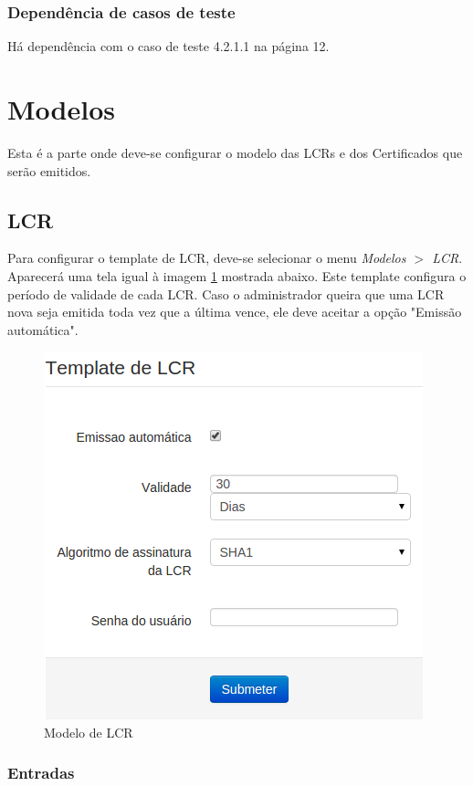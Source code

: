 \subsubsection{Dependência de casos de teste}
Há dependência com o caso de teste 4.2.1.1 na página 12.

\section{Modelos}

Esta é a parte onde deve-se configurar o modelo das LCRs e dos Certificados que serão emitidos.

\subsection{LCR}

Para configurar o template de LCR, deve-se selecionar o menu \textit{Modelos $>$ LCR}. Aparecerá uma tela igual à imagem \ref{fig:modelolcr} mostrada abaixo. Este template configura o período de validade de cada LCR. Caso o administrador queira que uma LCR nova seja emitida toda vez que a última vence, ele deve aceitar a opção "Emissão automática".

\begin{figure}[ht]
     \centering
     \includegraphics[scale=0.5]{images/modelolcr.png}
     \caption{Modelo de LCR}
     \label{fig:modelolcr}
\end{figure}

\subsubsection{Entradas}

